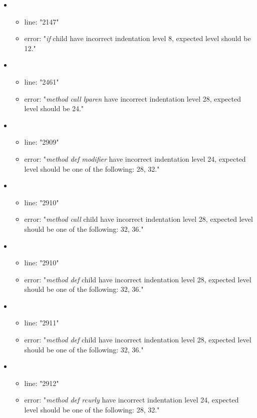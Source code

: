 \begin{itemize}
\begin{itemize}
	\end{itemize}
	\item 
	\begin{itemize} 
		\item line: "2147" 
		\item error: "\emph{if} child have incorrect indentation level 8, expected level should be 12." 
	\end{itemize}
	\item 
	\begin{itemize} 
		\item line: "2461" 
		\item error: "\emph{method call lparen} have incorrect indentation level 28, expected level should be 24." 
	\end{itemize}
	\item 
	\begin{itemize} 
		\item line: "2909" 
		\item error: "\emph{method def modifier} have incorrect indentation level 24, expected level should be one of the following: 28, 32." 
	\end{itemize}
	\item 
	\begin{itemize} 
		\item line: "2910" 
		\item error: "\emph{method call} child have incorrect indentation level 28, expected level should be one of the following: 32, 36." 
	\end{itemize}
	\item 
	\begin{itemize} 
		\item line: "2910" 
		\item error: "\emph{method def} child have incorrect indentation level 28, expected level should be one of the following: 32, 36." 
	\end{itemize}
	\item 
	\begin{itemize} 
		\item line: "2911" 
		\item error: "\emph{method def} child have incorrect indentation level 28, expected level should be one of the following: 32, 36." 
	\end{itemize}
	\item 
	\begin{itemize} 
		\item line: "2912" 
		\item error: "\emph{method def rcurly} have incorrect indentation level 24, expected level should be one of the following: 28, 32." 

\end{itemize}
\end{itemize}
